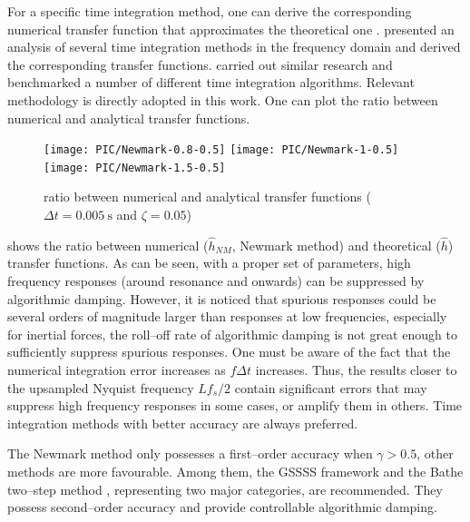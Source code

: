For a specific time integration method, one can derive the corresponding numerical transfer function that approximates the theoretical one . \citet{Preumont1982} presented an analysis of several time integration methods in the frequency domain and derived the corresponding transfer functions. \citet{AriasTrujillo2012} carried out similar research and benchmarked a number of different time integration algorithms. Relevant methodology is directly adopted in this work. One can plot the ratio between numerical and analytical transfer functions.%
\begin{figure}[htb!]
\centering
\texttt{[image: PIC/Newmark-0.8-0.5]}
\texttt{[image: PIC/Newmark-1-0.5]}
\texttt{[image: PIC/Newmark-1.5-0.5]}
\caption{ratio between numerical and analytical transfer functions ($\Delta{}t=\SI{0.005}{\second}$ and $\zeta=0.05$)}\label{fig:newmark_alg_damping}
\end{figure}
 shows the ratio between numerical ($\hat{h}_{NM}$, Newmark method) and theoretical ($\hat{h}$) transfer functions. As can be seen, with a proper set of parameters, high frequency responses (around resonance and onwards) can be suppressed by algorithmic damping. However, it is noticed that spurious responses could be several orders of magnitude larger than responses at low frequencies, especially for inertial forces, the roll--off rate of algorithmic damping is not great enough to sufficiently suppress spurious responses. One must be aware of the fact that the numerical integration error increases as $f\Delta{}t$ increases. Thus, the results closer to the upsampled Nyquist frequency $Lf_s/2$ contain significant errors that may suppress high frequency responses in some cases, or amplify them in others. Time integration methods with better accuracy are always preferred.
%

The Newmark method only possesses a first--order accuracy when $\gamma>0.5$, other methods are more favourable. Among them, the GSSSS framework \citep{Zhou2003,Zhou2006} and the Bathe two--step method \citep{Noh2019}, representing two major categories, are recommended. They possess second--order accuracy and provide controllable algorithmic damping.
